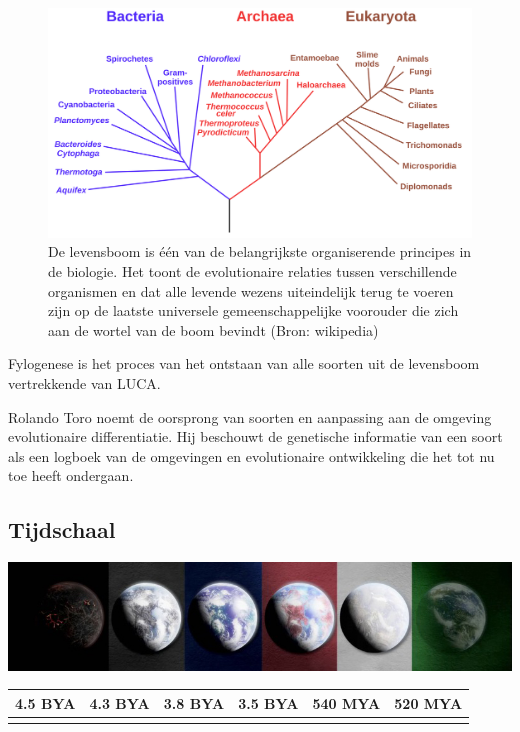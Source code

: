 \documentclass[
  11pt,
]{book}
\begin{document}
\begin{figure}

{\centering \includegraphics[width=1\linewidth]{./figs/Phylogenetic_tree} 

}

\caption{De levensboom is één van de belangrijkste organiserende principes in de biologie. Het toont de evolutionaire relaties tussen verschillende organismen en dat alle levende wezens uiteindelijk terug te voeren zijn op de laatste universele gemeenschappelijke voorouder die zich aan de wortel van de boom bevindt (Bron: wikipedia)}\label{fig:treeOfLifeBis}
\end{figure}

Fylogenese is het proces van het ontstaan van alle soorten uit de levensboom vertrekkende van LUCA.

Rolando Toro noemt de oorsprong van soorten en aanpassing aan de omgeving evolutionaire differentiatie. Hij beschouwt de genetische informatie van een soort als een logboek van de omgevingen en evolutionaire ontwikkeling die het tot nu toe heeft ondergaan.

\hypertarget{tijdschaal}{%
\subsection{Tijdschaal}\label{tijdschaal}}

\includegraphics{./figs/liferockystartstrip.jpeg}

\begin{longtable}[]{@{}llllll@{}}
\toprule()
4.5 BYA & 4.3 BYA & 3.8 BYA & 3.5 BYA & 540 MYA & 520 MYA \\
\midrule()
\endhead
& & & & & \\
\bottomrule()
\end{longtable}
\end{document}
